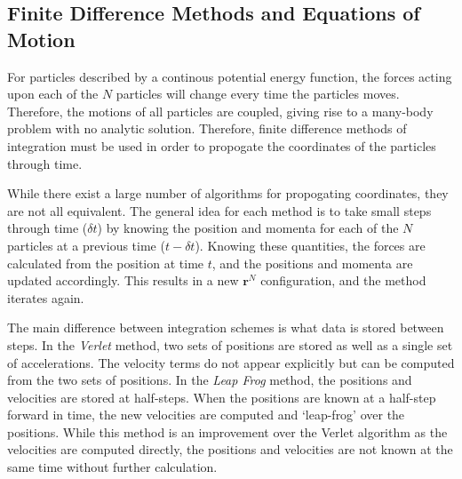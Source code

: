 \subsection{Finite Difference Methods and Equations of Motion}
For particles described by a continous potential energy function, the
forces acting upon each of the $N$ particles will change every time
the particles moves. Therefore, the motions of all particles are
coupled, giving rise to a many-body problem with no analytic
solution. Therefore, finite difference methods of integration must be
used in order to propogate the coordinates of the particles through
time.

While there exist a large number of algorithms for propogating
coordinates, they are not all equivalent. The general idea for each
method is to take small steps through time ($\delta t$) by knowing the
position and momenta for each of the $N$ particles at a previous time
($t-\delta t$). Knowing these quantities, the forces are calculated
from the position at time $t$, and the positions and momenta are
updated accordingly. This results in a new $\mathbf{r}^N$
configuration, and the method iterates again.

The main difference between integration schemes is what data is stored
between steps. In the \textit{Verlet} method, two sets of positions
are stored as well as a single set of accelerations. The velocity
terms do not appear explicitly but can be computed from the two sets
of positions. In the \textit{Leap Frog} method, the positions and
velocities are stored at half-steps. When the positions are known at a
half-step forward in time, the new velocities are computed and
`leap-frog' over the positions. While this method is an improvement
over the Verlet algorithm as the velocities are computed directly, the
positions and velocities are not known at the same time without
further calculation.

